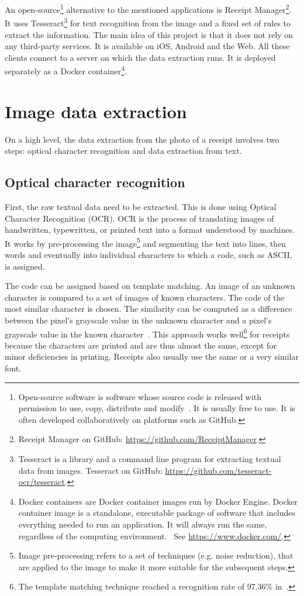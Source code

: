 \documentclass[
  digital, %
  table,   %
  oneside, %
  lof,     %
  lot,     %
]{fithesis3}
\begin{document}
An open-source\footnote{Open-source software is software whose source code is released with permission to use, copy, distribute and modify~\cite{GartnerOpenSource}. It is usually free to use. It is often developed collaboratively on platforms such as GitHub.} alternative to the mentioned applications is Receipt Manager\footnote{Receipt Manager on GitHub: \url{https://github.com/ReceiptManager}.}.
It uses Tesseract\footnote{Tesseract is a library and a command line program for extracting textual data from images. Tesseract on GitHub: \url{https://github.com/tesseract-ocr/tesseract}.} for text recognition from the image and a fixed set of rules to extract the information. The main idea of this project is that it does not rely on any third-party services.
It is available on iOS, Android and the Web. All these clients connect to a server on which the data extraction runs. It is deployed separately as a Docker container\footnote{Docker containers are Docker container images run by Docker Engine. Docker container image is a standalone, executable package of software that includes everything needed to run an application. It will always run the same, regardless of the computing environment.~\cite{DockerContainer} See \url{https://www.docker.com/}.}.

\chapter{Image data extraction}
On a high level, the data extraction from the photo of a receipt involves two steps: optical character recognition and data extraction from text.

\section{Optical character recognition}
First, the raw textual data need to be extracted. This is done using Optical Character Recognition (OCR). OCR is the process of translating images of handwritten, typewritten, or printed text into a format understood by machines.
It works by pre-processing the image\footnote{Image pre-processing refers to a set of techniques (e.g. noise reduction), that are applied to the image to make it more suitable for the subsequent steps.} and segmenting the text into lines, then words and eventually into individual characters to which a code, such as ASCII, is assigned.~\cite{Shreya2019OCRCNN}

The code can be assigned based on template matching. An image of an unknown character is compared to a set of images of known characters. The code of the most similar character is chosen. The similarity can be computed as a difference between the pixel's grayscale value in the unknown character and a pixel's grayscale value in the known character~\cite{Ziegaus2016TemplateMatching}.
This approach works well\footnote{The template matching technique reached a recognition rate of 97.36\% in~\cite{Ziegaus2016TemplateMatching}.} for receipts because the characters are printed and are thus almost the same, except for minor deficiencies in printing. Receipts also usually use the same or a very similar font.
\end{document}
